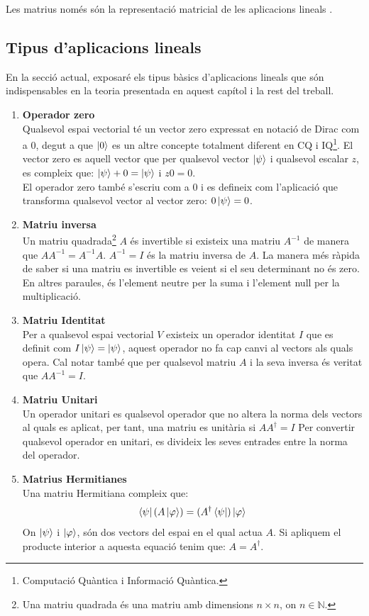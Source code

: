 Les matrius només són la representació matricial de les aplicacions lineals \cite{LR_done_right:matrix}.

	\subsection{Tipus d'aplicacions lineals}
En la secció actual, exposaré els tipus bàsics d'aplicacions lineals que són indispensables en la teoria presentada en aquest capítol i la rest del treball.

\begin{enumerate}
	\item \textbf{Operador zero} \\
	Qualsevol espai vectorial té un vector zero expressat en notació de Dirac com a $0$, degut a que $\ket{0}$ es un altre concepte totalment diferent en CQ i IQ\footnote{Computació Quàntica i Informació Quàntica.}. El vector zero es aquell vector que per qualsevol vector $\ket{\psi}$ i qualsevol escalar $z$, es compleix que:	
	$\ket{\psi} + 0 = \ket{\psi} $ i $z0 = 0$. \\
	El operador zero també s'escriu com a $0$ i es defineix com l'aplicació que transforma qualsevol vector al vector zero: $0\ket{\psi} = 0 $.  
	
	\item \textbf{Matriu inversa} \\
	Un matriu quadrada\footnote{Una matriu quadrada és una matriu amb dimensions $n\times n$, on $n \in \mathbb{N}$.} $A$ és invertible si existeix una matriu $A^{-1}$ de manera que $AA^{-1}=A^{-1}A$. $A^{-1} = I$ és la matriu inversa de $A$. La manera més ràpida de saber si una matriu es invertible es veient si el seu determinant no és zero. En altres paraules, és l'element neutre per la suma i l'element null per la multiplicació. 

	\item \textbf{Matriu Identitat} \\
	Per a qualsevol espai vectorial $V$ existeix un operador identitat $I$ que es definit com $I\ket{\psi} = \ket{\psi}$, aquest operador no fa cap canvi al vectors als quals opera. Cal notar també que per qualsevol matriu $A$ i la seva inversa és veritat que $AA^{-1} = I$. 
	
	\item \textbf{Matriu Unitari} \\
	Un operador unitari es qualsevol operador que no altera la norma dels vectors al quals es aplicat, per tant, una matriu es unitària si $AA^\dagger = I$
	Per convertir qualsevol operador en unitari, es divideix les seves entrades entre la norma del operador. 
	
	\item \textbf{Matrius Hermitianes} \\
	Una matriu Hermitiana compleix que: 
	$$
	\bra{\psi} (A \ket{\varphi}) = (A^\dagger\bra{\psi})\ket{\varphi}
	$$
	On $\ket{\psi}$ i $\ket{\varphi}$, són dos vectors del espai en el qual actua $A$. Si apliquem el producte interior a aquesta equació tenim que: $A = A^\dagger$.
	
\end{enumerate}

